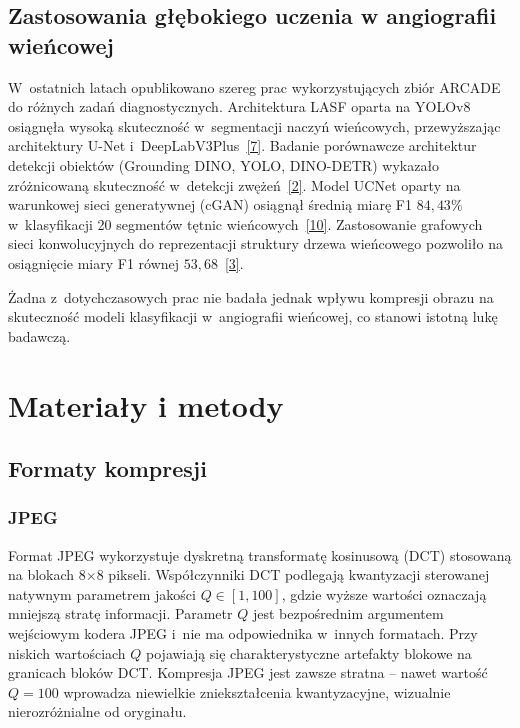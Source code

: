 \documentclass[12pt,a4paper]{article}
\newcommand{\mycite}[1]{\hyperlink{bib#1}{[#1]}}
\begin{document}
\subsection{Zastosowania głębokiego uczenia w angiografii wieńcowej}

W~ostatnich latach opublikowano szereg prac wykorzystujących zbiór ARCADE do różnych zadań diagnostycznych. Architektura LASF oparta na YOLOv8 osiągnęła wysoką skuteczność w~segmentacji naczyń wieńcowych, przewyższając architektury U-Net i~DeepLabV3Plus~\mycite{7}. Badanie porównawcze architektur detekcji obiektów (Grounding DINO, YOLO, DINO-DETR) wykazało zróżnicowaną skuteczność w~detekcji zwężeń~\mycite{2}. Model UCNet oparty na warunkowej sieci generatywnej (cGAN) osiągnął średnią miarę F1 $84{,}43\%$ w~klasyfikacji 20 segmentów tętnic wieńcowych~\mycite{10}. Zastosowanie grafowych sieci konwolucyjnych do reprezentacji struktury drzewa wieńcowego pozwoliło na osiągnięcie miary F1 równej $53{,}68$~\mycite{3}.

Żadna z~dotychczasowych prac nie badała jednak wpływu kompresji obrazu na skuteczność modeli klasyfikacji w~angiografii wieńcowej, co stanowi istotną lukę badawczą.

\clearpage
\section{Materiały i metody}
\label{sec:materialy}

\subsection{Formaty kompresji}
\label{sec:formaty}

\subsubsection{JPEG}
Format JPEG wykorzystuje dyskretną transformatę kosinusową (DCT) stosowaną na blokach 8$\times$8 pikseli. Współczynniki DCT podlegają kwantyzacji sterowanej natywnym parametrem jakości $Q \in [1, 100]$, gdzie wyższe wartości oznaczają mniejszą stratę informacji. Parametr $Q$ jest bezpośrednim argumentem wejściowym kodera JPEG i~nie ma odpowiednika w~innych formatach. Przy niskich wartościach $Q$ pojawiają się charakterystyczne artefakty blokowe na granicach bloków DCT. Kompresja JPEG jest zawsze stratna -- nawet wartość~$Q=100$ wprowadza niewielkie zniekształcenia kwantyzacyjne, wizualnie nierozróżnialne od oryginału.
\end{document}
